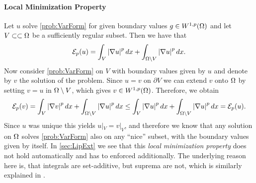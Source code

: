 \paragraph*{Local Minimization Property} Let $u$ solve \cref{prob:VarForm} for given boundary values $g\in W^{1,p}(\Omega)$ and let $V\subset\subset\Omega$ be a sufficiently regular subset. Then we have that
%
\begin{align*}
\mathcal{E}_p(u) = \int_{V} \left|\nabla u\right|^p dx + \int_{\Omega\setminus V} \left|\nabla u\right|^p dx.
\end{align*}
%
Now consider \cref{prob:VarForm} on $V$ with boundary values given by $u$ and denote by $v$ the solution of the problem. Since $u=v$ on $\partial V$ we can extend $v$ onto $\Omega$ by setting $v=u$ in $\Omega\setminus V$, which gives $v\in W^{1,p}(\Omega)$. Therefore, we obtain
%
\begin{align*}
\mathcal{E}_p(v) = \int_{V} \left|\nabla v\right|^p dx + \int_{\Omega\setminus V} \left|\nabla u\right|^p dx \leq 
\int_{V} \left|\nabla u\right|^p dx + \int_{\Omega\setminus V} \left|\nabla u\right|^p dx = \mathcal{E}_p(u).
\end{align*}
%
Since $u$ was unique this yields $u|_V = v|_V$, and therefore we know that any solution on $\Omega$ solves \cref{prob:VarForm} also on any \enquote{nice} subset, with the boundary values given by itself. In \cref{sec:LipExt} we see that this \textit{local minimization property} does not hold automatically and has to enforced additionally. The underlying reason here is, that integrals are set-additive, but suprema are not, which is similarly explained in \cite{aronsson2004tour}.

%
%
